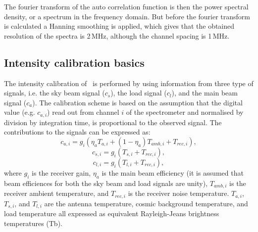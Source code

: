 The fourier transform of the auto correlation function is then the
power spectral density, or a spectrum in the frequency domain. 
But before the fourier transform is calculated a Hanning smoothing is
applied, which gives that the obtained resolution of the spectra is 2\,MHz,
although the channel spacing is 1\,MHz.


\subsection{Intensity calibration basics}

The intensity calibration of \smr\ is performed by using
information from three type of signals, i.e. the sky beam signal
(\(c_{s}\)),
the load signal (\(c_{l}\)), and the main beam signal (\(c_{a}\)).
The calibration scheme is based on the assumption that the 
digital value (e.g. \(c_{a,i}\)) read out from channel \(i\) of the 
spectrometer and 
normalised by division by integration time, is proportional to the
observed signal. The contributions to the signals 
can be expressed as:
\begin{equation}
c_{a,i}=g_{i}\left(\eta_{a} T_{a,i}+(1-\eta_{a})T_{amb,i}+T_{rec,i}\right),
\end{equation}
\begin{equation}
\label{eq:skybeam}
c_{s,i}=g_{i}\left(T_{s,i}+T_{rec,i}\right),
\end{equation}
\begin{equation}
c_{l,i}=g_{i}\left(T_{l,i}+T_{rec,i}\right),
\end{equation}
where \(g_{i}\) is the receiver gain, \(\eta_{a}\) is the main beam
efficiency (it is assumed that beam efficiences for 
both the sky beam and load signals are unity), 
\(T_{amb,i}\) is the receiver ambient temperature,
and \(T_{rec,i}\) is the receiver noise temperature.
\(T_{a,i}\), \(T_{s,i}\), and \(T_{l,i}\) are the antenna temperature,
cosmic background temperature, and load temperature all expressed
as equivalent Rayleigh-Jeans brightness temperatures (Tb).

